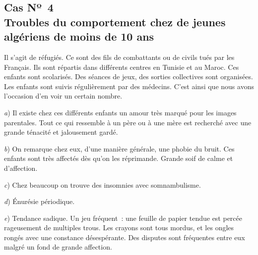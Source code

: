 \documentclass[french,twoside]{book} %
\begin{document}
\subsection[{Cas Nº 4. Troubles du comportement chez de jeunes algériens de moins de 10 ans}]{Cas Nº 4 \\
Troubles du comportement chez de jeunes algériens de moins de 10 ans}
\noindent Il s’agit de réfugiés. Ce sont des fils de combattants ou de civils tués par les Français. Ils sont répartis dans différents centres en Tunisie et au Maroc. Ces enfants sont scolarisés. Des séances de jeux, des sorties collectives sont organisées. Les enfants sont suivis régulièrement par des médecins. C’est ainsi que nous avons l’occasion d’en voir un certain nombre.\par
\bigbreak
\noindent \emph{a}) Il existe chez ces différents enfants un amour très marqué pour les images parentales. Tout ce qui ressemble à un père ou à une mère est recherché avec une grande ténacité et jalousement gardé.\par
\emph{b}) On remarque chez eux, d’une manière générale, une phobie du bruit. Ces enfants sont très affectés dès qu’on les réprimande. Grande soif de calme et d’affection.\par
\emph{c}) Chez beaucoup on trouve des insomnies avec somnambulisme.\par
\emph{d}) Énurésie périodique.\par
\emph{e}) Tendance sadique. Un jeu fréquent : une feuille de papier tendue est percée rageusement de multiples trous. Les crayons sont tous mordus, et les ongles rongés avec une constance désespérante. Des disputes sont fréquentes entre eux malgré un fond de grande affection.
\end{document}

